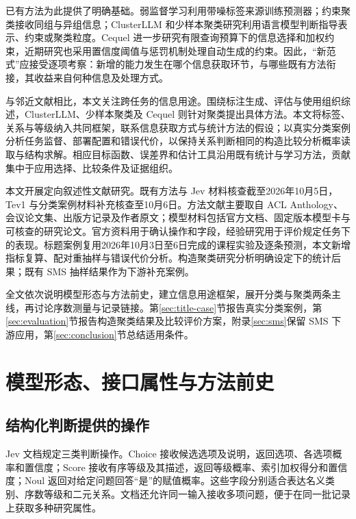 \documentclass[UTF8,a4paper,zihao=-4,fontset=fandol]{ctexart}
\begin{document}
已有方法为此提供了明确基础。弱监督学习利用带噪标签来源训练预测器\citep{ratner2017}；约束聚类接收同组与异组信息\citep{wagstaff2001}；ClusterLLM 和少样本聚类研究利用语言模型判断指导表示、约束或聚类粒度\citep{clusterllm2023,viswanathan2024}。Cequel 进一步研究有限查询预算下的信息选择和加权约束，近期研究也采用置信度阈值与惩罚机制处理自动生成的约束\citep{cequel2025,jia2026}。因此，“新范式”应接受逐项考察：新增的能力发生在哪个信息获取环节，与哪些既有方法衔接，其收益来自何种信息及处理方式。

与邻近文献相比，本文关注跨任务的信息用途。\citet{tan2024}围绕标注生成、评估与使用组织综述，ClusterLLM、少样本聚类及 Cequel 则针对聚类提出具体方法。本文将标签、关系与等级纳入共同框架，联系信息获取方式与统计方法的假设；以真实分类案例分析任务监督、部署配置和错误代价，以保持关系判断相同的构造比较分析概率读取与结构求解。相应目标函数、误差界和估计工具沿用既有统计与学习方法，贡献集中于应用选择、比较条件及证据组织。

本文开展定向叙述性文献研究。既有方法与 Jev 材料核查截至2026年10月5日，Tev1 与分类案例材料补充核查至10月6日。方法文献主要取自 ACL Anthology、会议论文集、出版方记录及作者原文；模型材料包括官方文档、固定版本模型卡与可核查的研究论文。官方资料用于确认操作和字段，经验研究用于评价规定任务下的表现。标题案例复用2026年10月3日至6日完成的课程实验及逐条预测，本文新增指标复算、配对重抽样与错误代价分析。构造聚类研究分析明确设定下的统计后果；既有 SMS 抽样结果作为下游补充案例。

全文依次说明模型形态与方法前史，建立信息用途框架，展开分类与聚类两条主线，再讨论序数测量与记录链接。第\ref{sec:title-case}节报告真实分类案例，第\ref{sec:evaluation}节报告构造聚类结果及比较评价方案，附录\ref{sec:sms}保留 SMS 下游应用，第\ref{sec:conclusion}节总结适用条件。

\section{模型形态、接口属性与方法前史}\label{sec:history}

\subsection{结构化判断提供的操作}

Jev 文档规定三类判断操作。Choice 接收候选选项及说明，返回选项、各选项概率和置信度；Score 接收有序等级及其描述，返回等级概率、索引加权得分和置信度；Noul 返回对给定问题回答“是”的赋值概率\citep{typesafe-choice,typesafe-score,typesafe-noul}。这些字段分别适合表达名义类别、序数等级和二元关系。文档还允许同一输入接收多项问题\citep{typesafe-intro}，便于在同一批记录上获取多种研究属性。
\end{document}
